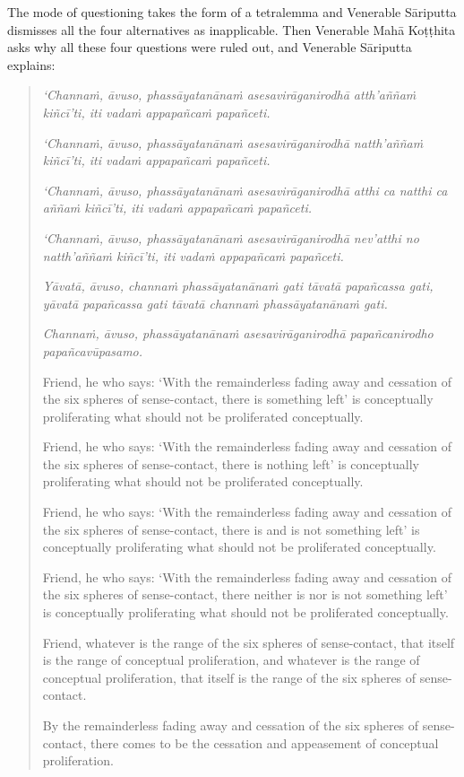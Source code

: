 The mode of questioning takes the form of a tetralemma and Venerable Sāriputta dismisses all the four alternatives as inapplicable. Then Venerable Mahā Koṭṭhita asks why all these four questions were ruled out, and Venerable Sāriputta explains:

\begin{quote}
\emph{`Channaṁ, āvuso, phassāyatanānaṁ asesavirāganirodhā atth'aññaṁ kiñcī'ti, iti vadaṁ appapañcaṁ papañceti.}

\emph{`Channaṁ, āvuso, phassāyatanānaṁ asesavirāganirodhā natth'aññaṁ kiñcī'ti, iti vadaṁ appapañcaṁ papañceti.}

\emph{`Channaṁ, āvuso, phassāyatanānaṁ asesavirāganirodhā atthi ca natthi ca aññaṁ kiñcī'ti, iti vadaṁ appapañcaṁ papañceti.}

\emph{`Channaṁ, āvuso, phassāyatanānaṁ asesavirāganirodhā nev'atthi no natth'aññaṁ kiñcī'ti, iti vadaṁ appapañcaṁ papañceti.}

\emph{Yāvatā, āvuso, channaṁ phassāyatanānaṁ gati tāvatā papañcassa gati, yāvatā papañcassa gati tāvatā channaṁ phassāyatanānaṁ gati.}

\emph{Channaṁ, āvuso, phassāyatanānaṁ asesavirāganirodhā papañcanirodho papañcavūpasamo.}

Friend, he who says: `With the remainderless fading away and cessation of the six spheres of sense-contact, there is something left' is conceptually proliferating what should not be proliferated conceptually.

Friend, he who says: `With the remainderless fading away and cessation of the six spheres of sense-contact, there is nothing left' is conceptually proliferating what should not be proliferated conceptually.

Friend, he who says: `With the remainderless fading away and cessation of the six spheres of sense-contact, there is and is not something left' is conceptually proliferating what should not be proliferated conceptually.

Friend, he who says: `With the remainderless fading away and cessation of the six spheres of sense-contact, there neither is nor is not something left' is conceptually proliferating what should not be proliferated conceptually.

Friend, whatever is the range of the six spheres of sense-contact, that itself is the range of conceptual proliferation, and whatever is the range of conceptual proliferation, that itself is the range of the six spheres of sense-contact.

By the remainderless fading away and cessation of the six spheres of sense-contact, there comes to be the cessation and appeasement of conceptual proliferation.
\end{quote}

